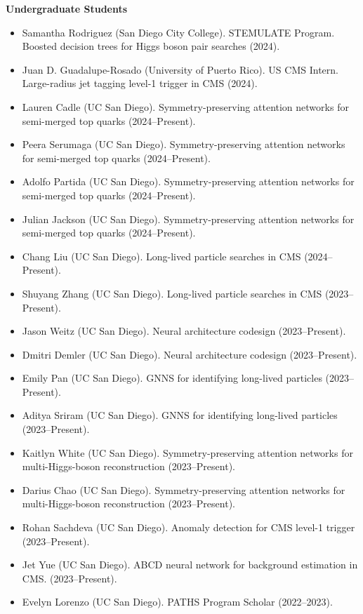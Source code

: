 \documentclass[11pt]{res}
\begin{document}
\begin{resume}
  \textbf{Undergraduate Students}
  \begin{itemize}
    \itemsep-0.3em
    \item Samantha Rodriguez (San Diego City College). STEMULATE Program. Boosted decision trees for Higgs boson pair searches (2024).
    \item Juan D. Guadalupe-Rosado (University of Puerto Rico). US CMS Intern. Large-radius jet tagging level-1 trigger in CMS (2024).
    \item Lauren Cadle (UC San Diego). Symmetry-preserving attention networks for semi-merged top quarks (2024--Present).
    \item Peera Serumaga (UC San Diego).  Symmetry-preserving attention networks for semi-merged top quarks (2024--Present).
    \item Adolfo Partida (UC San Diego). Symmetry-preserving attention networks for semi-merged top quarks (2024--Present).
    \item Julian Jackson (UC San Diego). Symmetry-preserving attention networks for semi-merged top quarks (2024--Present).
    \item Chang Liu (UC San Diego). Long-lived particle searches in CMS (2024--Present).
    \item Shuyang Zhang (UC San Diego). Long-lived particle searches in CMS (2023--Present).
    \item Jason Weitz (UC San Diego). Neural architecture codesign (2023--Present).
    \item Dmitri Demler (UC San Diego). Neural architecture codesign (2023--Present).
    \item Emily Pan (UC San Diego). GNNS for identifying long-lived particles (2023--Present).
    \item Aditya Sriram (UC San Diego). GNNS for identifying long-lived particles (2023--Present).
    \item Kaitlyn White (UC San Diego). Symmetry-preserving attention networks for multi-Higgs-boson reconstruction (2023--Present).
    \item Darius Chao (UC San Diego). Symmetry-preserving attention networks for multi-Higgs-boson reconstruction (2023--Present).
    \item Rohan Sachdeva (UC San Diego). Anomaly detection for CMS level-1 trigger (2023--Present).
    \item Jet Yue (UC San Diego). ABCD neural network for background estimation in CMS. ({2023--Present}).
    \item Evelyn Lorenzo (UC San Diego). PATHS Program Scholar (2022--2023).

\end{itemize}
\end{resume}
\end{document}
